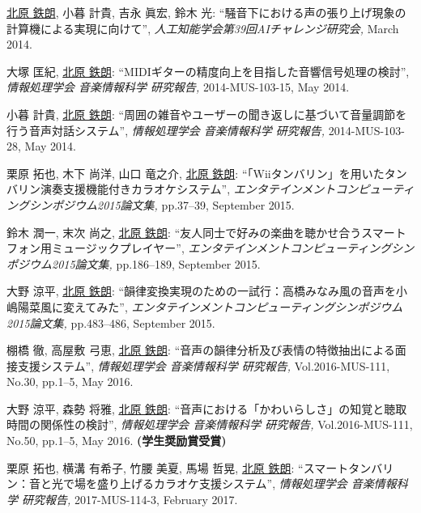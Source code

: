 \begin{Enumerate}
\item 
\underline{北原 鉄朗}, 
小暮 計貴, 
吉永 眞宏, 
鈴木 光: 
    ``騒音下における声の張り上げ現象の計算機による実現に向けて'', 
    {\it 人工知能学会第39回AIチャレンジ研究会,
    } March 2014. 

\item 
大塚 匡紀, 
\underline{北原 鉄朗}: 
    ``MIDIギターの精度向上を目指した音響信号処理の検討'', 
    {\it 情報処理学会 音楽情報科学 研究報告,
    } 2014-MUS-103-15, May 2014. 

\item 
小暮 計貴, 
\underline{北原 鉄朗}: 
    ``周囲の雑音やユーザーの聞き返しに基づいて音量調節を行う音声対話システム'', 
    {\it 情報処理学会 音楽情報科学 研究報告,
    } 2014-MUS-103-28, May 2014. 

\item 
栗原 拓也, 
木下 尚洋, 
山口 竜之介, 
\underline{北原 鉄朗}: 
    ``「Wiiタンバリン」を用いたタンバリン演奏支援機能付きカラオケシステム'', 
    {\it エンタテインメントコンピューティングシンポジウム2015論文集,
    } pp.37--39, September 2015. 

\item 
鈴木 潤一, 
末次 尚之, 
\underline{北原 鉄朗}: 
    ``友人同士で好みの楽曲を聴かせ合うスマートフォン用ミュージックプレイヤー'', 
    {\it エンタテインメントコンピューティングシンポジウム2015論文集,
    } pp.186--189, September 2015. 

\item 
大野 涼平, 
\underline{北原 鉄朗}: 
    ``韻律変換実現のための一試行：高橋みなみ風の音声を小嶋陽菜風に変えてみた'', 
    {\it エンタテインメントコンピューティングシンポジウム2015論文集,
    } pp.483--486, September 2015. 

\item 
棚橋 徹, 
高屋敷 弓恵, 
\underline{北原 鉄朗}: 
    ``音声の韻律分析及び表情の特徴抽出による面接支援システム'', 
    {\it 情報処理学会 音楽情報科学 研究報告,
    } Vol.2016-MUS-111, No.30, pp.1--5, May 2016. 

\item 
大野 涼平, 
森勢 将雅, 
\underline{北原 鉄朗}: 
    ``音声における「かわいらしさ」の知覚と聴取時間の関係性の検討'', 
    {\it 情報処理学会 音楽情報科学 研究報告,
    } Vol.2016-MUS-111, No.50, pp.1--5, May 2016. 
{\bf (学生奨励賞受賞)}
\item 
栗原 拓也, 
横溝 有希子, 
竹腰 美夏, 
馬場 哲晃, 
\underline{北原 鉄朗}: 
    ``スマートタンバリン：音と光で場を盛り上げるカラオケ支援システム'', 
    {\it 情報処理学会 音楽情報科学 研究報告,
    } 2017-MUS-114-3, February 2017. 


\end{Enumerate}
